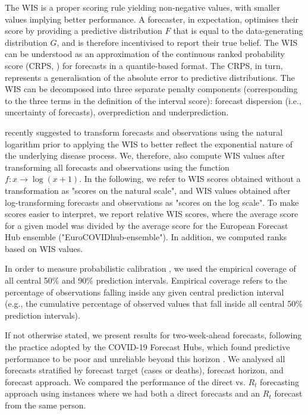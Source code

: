 \documentclass[10pt,a4paper,twocolumn]{article}
\begin{document}
The WIS is a proper scoring rule yielding non-negative values, with smaller values implying better performance. A forecaster, in expectation, optimises their score by providing a predictive distribution $F$ that is equal to the data-generating distribution $G$, and is therefore incentivised to report their true belief. The WIS can be understood as an approximation of the continuous ranked probability score (CRPS, \citealt{gneitingProbabilisticForecastsCalibration2007}) for forecasts in a quantile-based format. The CRPS, in turn, represents a generalisation of the absolute error to predictive distributions. The WIS can be decomposed into three separate penalty components (corresponding to the three terms in the definition of the interval score): forecast dispersion (i.e., uncertainty of forecasts), overprediction and underprediction. 

\citet{bosseTransformationForecastsEvaluating2023} recently suggested to transform forecasts and observations using the natural logarithm prior to applying the WIS to better reflect the exponential nature of the underlying disease process. We, therefore, also compute WIS values after transforming all forecasts and observations using the function $f\colon x \to \log (x + 1)$. In the following, we refer to WIS scores obtained without a transformation as "scores on the natural scale", and WIS values obtained after log-transforming forecasts and observations as "scores on the log scale". To make scores easier to interpret, we report relative WIS scores, where the average score for a given model was divided by the average score for the European Forecast Hub ensemble ("EuroCOVIDhub-ensemble"). In addition, we computed ranks based on WIS values. 

In order to measure probabilistic calibration \citep{gneitingProbabilisticForecastsCalibration2007}, we used the empirical coverage of all central 50\% and 90\% prediction intervals. Empirical coverage refers to the percentage of observations falling inside any given central prediction interval (e.g., the cumulative percentage of observed values that fall inside all central 50\% prediction intervals). 

If not otherwise stated, we present results for two-week-ahead forecasts, following the practice adopted by the COVID-19 Forecast Hubs, which found predictive performance to be poor and unreliable beyond this horizon \cite{cramerEvaluationIndividualEnsemble2021, sherrattPredictivePerformanceMultimodel2022, bracherPreregisteredShorttermForecasting2021a}. We analysed all forecasts stratified by forecast target (cases or deaths), forecast horizon, and forecast approach. We compared the performance of the direct vs. $R_t$ forecasting approach using instances where we had both a direct forecasts and an $R_t$ forecast from the same person. 
\end{document}
